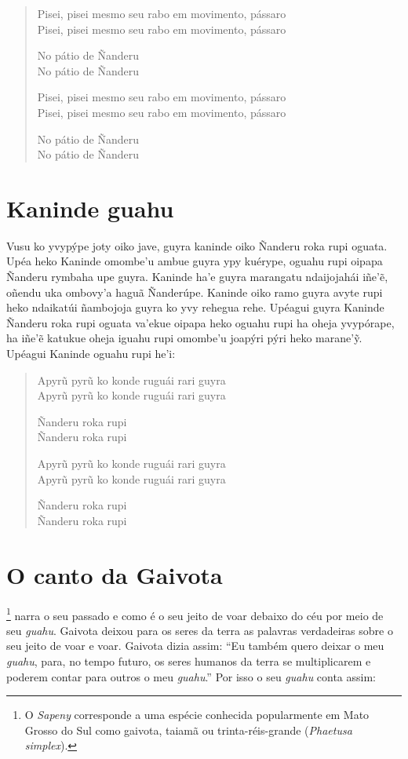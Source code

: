 \begin{verse}
Pisei, pisei mesmo seu rabo em movimento, pássaro\\
Pisei, pisei mesmo seu rabo em movimento, pássaro

No pátio de Ñanderu\\
No pátio de Ñanderu

Pisei, pisei mesmo seu rabo em movimento, pássaro\\
Pisei, pisei mesmo seu rabo em movimento, pássaro

No pátio de Ñanderu\\
No pátio de Ñanderu
\end{verse}

\chapter{Kaninde guahu}

 Vusu ko yvypýpe joty oiko jave, guyra kaninde oiko Ñanderu roka
rupi oguata. Upéa heko Kaninde omombe'u ambue guyra ypy kuérype, oguahu
rupi oipapa Ñanderu rymbaha upe guyra. Kaninde ha'e guyra marangatu
ndaijojahái iñe'ẽ, oñendu uka ombovy'a haguã Ñanderúpe. Kaninde oiko
ramo guyra avyte rupi heko ndaikatúi ñambojoja guyra ko yvy rehegua
rehe. Upéagui guyra Kaninde Ñanderu roka rupi oguata va'ekue oipapa heko
oguahu rupi ha oheja yvypórape, ha iñe'ẽ katukue oheja iguahu rupi
omombe'u joapýri pýri heko marane'ỹ. Upéagui Kaninde oguahu rupi he'i:

\begin{verse}
Apyrũ pyrũ ko konde ruguái rari guyra\\
Apyrũ pyrũ ko konde ruguái rari guyra

Ñanderu roka rupi\\
Ñanderu roka rupi

Apyrũ pyrũ ko konde ruguái rari guyra\\
Apyrũ pyrũ ko konde ruguái rari guyra

Ñanderu roka rupi\\
Ñanderu roka rupi
\end{verse}

\chapter{O canto da Gaivota}

\footnote{O \textit{Sapeny} corresponde a uma espécie conhecida
  popularmente em Mato Grosso do Sul como gaivota, taiamã ou
  trinta-réis-grande (\textit{Phaetusa simplex}).} narra o seu passado e
como é o seu jeito de voar debaixo do céu por meio de seu \textit{guahu}.
Gaivota deixou para os seres da terra as palavras verdadeiras sobre o
seu jeito de voar e voar. Gaivota dizia assim: ``Eu também quero deixar
o meu \textit{guahu}, para, no tempo futuro, os seres humanos da terra se
multiplicarem e poderem contar para outros o meu \textit{guahu}.'' Por
isso o seu \textit{guahu} conta assim:

